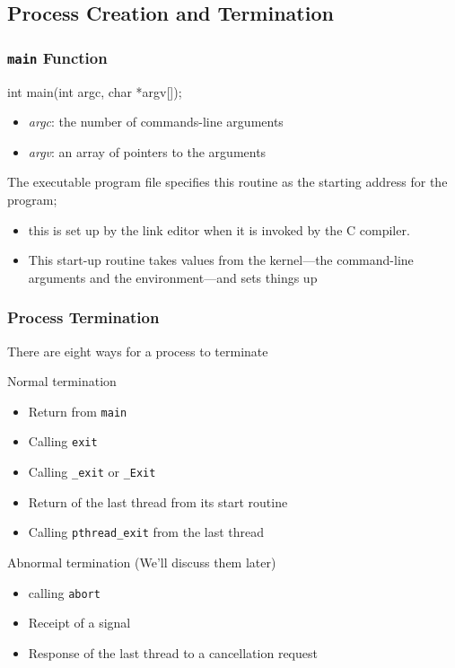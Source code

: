 \documentclass[newPxFont,sthlmFooter,nooffset]{beamer}
\begin{document}
\subsection{Process Creation and Termination }

\begin{frame}[containsverbatim,t]
  \frametitle{\texttt{main} Function}
\begin{codedef}
int main(int argc, char *argv[]);
\end{codedef}
\begin{itemize}
\item \textit{argc}: the number of commands-line arguments
\item \textit{argv}: an array of pointers to the arguments
\end{itemize}

The executable program file specifies this routine as the starting address for the program;
\begin{itemize}
\item this is set up by the link editor when it is invoked by the C
  compiler.
\item This start-up routine takes values from the kernel---the
  command-line arguments and the environment---and sets things up 
\end{itemize}

\end{frame}



\begin{frame}[t]
  \frametitle{Process Termination}

There are eight ways for a process to terminate

Normal termination
\begin{itemize}
\item Return from \texttt{main}
\item Calling \texttt{exit}
\item Calling \texttt{\_exit} or \texttt{\_Exit}
\item Return of the last thread from its start routine
\item Calling \texttt{pthread\_exit} from the last thread
\end{itemize}

Abnormal termination (We'll discuss them later)
\begin{itemize}
\item calling \texttt{abort}
\item Receipt of a signal
\item Response of the last thread to a cancellation request
\end{itemize}

\end{frame}
\end{document}
